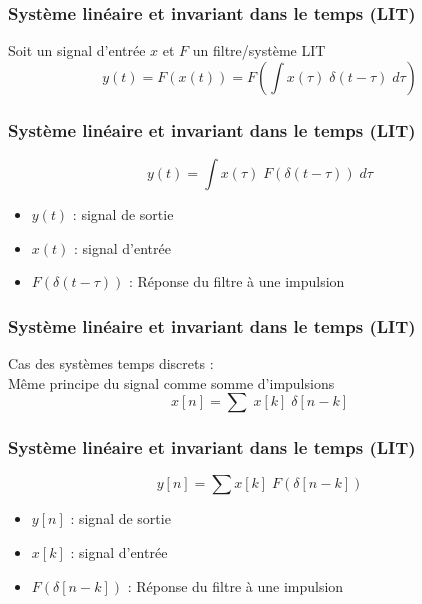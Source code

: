 \documentclass{beamer}
\begin{document}
\begin{frame} 
\frametitle{Système linéaire et invariant dans le temps (LIT) }
Soit un signal d'entrée $x$  et $F$ un filtre/système LIT\\

\[y(t) = F(x(t)) = F(\int x(\tau)  \; \delta(t-\tau) \; d\tau)\]

\vspace{0.2cm}
\vspace{0.2cm}
\vspace{0.2cm}

\end{frame}

\begin{frame} 
\frametitle{Système linéaire et invariant dans le temps (LIT) }
\[y(t) =  \int  x(\tau)  \; F(\delta(t-\tau)) \; d\tau\]
\begin{itemize}
\item<2-> $y(t)$  : signal de sortie 
\item<3-> $x(t)$  : signal d'entrée
\item<4-> $F(\delta(t-\tau))$  : Réponse du filtre à une impulsion
\end{itemize}
\vspace{0.3cm}
\end{frame}

\begin{frame} 
\frametitle{Système linéaire et invariant dans le temps (LIT) }
Cas des systèmes temps discrets :\\
\vspace{0.3cm}
Même principe du signal comme somme d'impulsions
\[x[n] =  \displaystyle \sum \; x[k] \; \delta[n-k] \] 
\end{frame}

\begin{frame} 
\frametitle{Système linéaire et invariant dans le temps (LIT) }
\[ y[n] =  \sum x[k] \;F(\delta[n-k]) \]
\begin{itemize}
\item<2-> $y[n]$  : signal de sortie 
\item<3-> $x[k]$  : signal d'entrée
\item<4-> $F(\delta[n-k])$  : Réponse du filtre à une impulsion
\end{itemize}
\vspace{0.3cm}
\end{frame}
\end{document}
